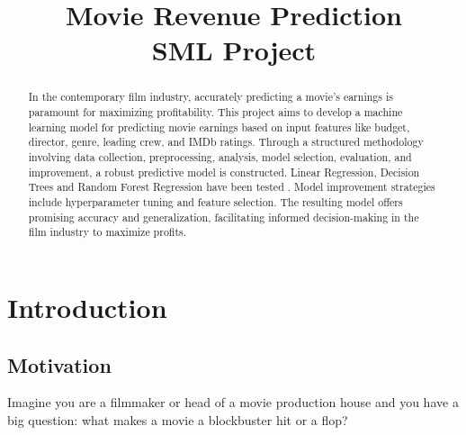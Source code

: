 \documentclass[conference]{IEEEtran}
\begin{document}
\title{Movie Revenue Prediction\\ SML Project}

\author{
     \vspace*{3.0pt}
    \and
     \vspace*{3.0pt}
}


\maketitle

\begin{abstract}
    In the contemporary film industry, accurately predicting a movie's earnings is paramount for maximizing profitability. This project aims to develop a machine learning model for predicting movie earnings based on input features like budget, director, genre, leading crew, and IMDb ratings. Through a structured methodology involving data collection, preprocessing, analysis, model selection, evaluation, and improvement, a robust predictive model is constructed. Linear Regression, Decision Trees and Random Forest Regression have been tested . Model improvement strategies include hyperparameter tuning and feature selection. The resulting model offers promising accuracy and generalization, facilitating informed decision-making in the film industry to maximize profits.
\end{abstract}

\IEEEpeerreviewmaketitle

\section{Introduction}
    \subsection{Motivation}
        Imagine you are a filmmaker or head of a movie production house and you have a big question: what makes a movie a blockbuster hit or a flop?
        
\end{document}
